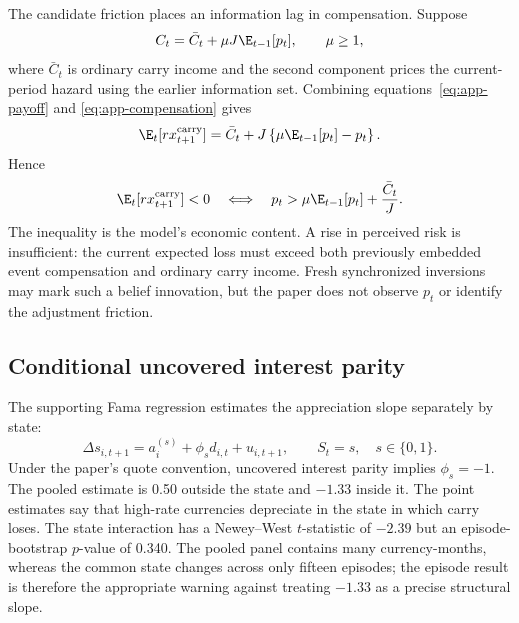 The candidate friction places an information lag in compensation. Suppose
\begin{equation}
C_t=\bar C_t+\mu J\E_{t-1}[p_t],
\qquad \mu\geq1,
\label{eq:app-compensation}
\end{equation}
where $\bar C_t$ is ordinary carry income and the second component prices the current-period hazard using the earlier information set. Combining equations~\eqref{eq:app-payoff} and \eqref{eq:app-compensation} gives
\begin{equation}
\E_t[rx^{\mathrm{carry}}_{t+1}]
=\bar C_t+J\left\{\mu\E_{t-1}[p_t]-p_t\right\}.
\label{eq:app-expected-return}
\end{equation}
Hence
\begin{equation}
\E_t[rx^{\mathrm{carry}}_{t+1}]<0
\quad\Longleftrightarrow\quad
p_t>\mu\E_{t-1}[p_t]+\frac{\bar C_t}{J}.
\label{eq:app-negative-mean}
\end{equation}
The inequality is the model's economic content. A rise in perceived risk is insufficient: the current expected loss must exceed both previously embedded event compensation and ordinary carry income. Fresh synchronized inversions may mark such a belief innovation, but the paper does not observe $p_t$ or identify the adjustment friction.

\subsection{Conditional uncovered interest parity}

The supporting Fama regression estimates the appreciation slope separately by state:
\begin{equation}
\Delta s_{i,t+1}=a_i^{(s)}+\phi_s d_{i,t}+u_{i,t+1},
\qquad S_t=s,\quad s\in\{0,1\}.
\label{eq:app-fama}
\end{equation}
Under the paper's quote convention, uncovered interest parity implies $\phi_s=-1$. The pooled estimate is 0.50 outside the state and $-1.33$ inside it. The point estimates say that high-rate currencies depreciate in the state in which carry loses. The state interaction has a Newey--West $t$-statistic of $-2.39$ but an episode-bootstrap $p$-value of 0.340. The pooled panel contains many currency-months, whereas the common state changes across only fifteen episodes; the episode result is therefore the appropriate warning against treating $-1.33$ as a precise structural slope.
